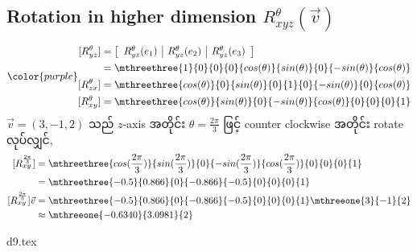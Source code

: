 \subsection{Rotation in higher dimension $R_{xyz}^\theta(\vec{v})$}
\begin{equation}
    {\color{purple}\begin{split}
        [R_{yz}^\theta]&=\left[\begin{array}{c|c|c}
            R_{yz}^\theta(e_1) & R_{yz}^\theta(e_2) & R_{yz}^\theta(e_3)
        \end{array}\right] \\
        &=\mthreethree{1}{0}{0}{0}{cos(\theta)}{sin(\theta)}{0}{-sin(\theta)}{cos(\theta)} \\
        [R_{zx}^\theta]&=\mthreethree{cos(\theta)}{0}{sin(\theta)}{0}{1}{0}{-sin(\theta)}{0}{cos(\theta)} \\
        [R_{xy}^\theta]&=\mthreethree{cos(\theta)}{sin(\theta)}{0}{-sin(\theta)}{cos(\theta)}{0}{0}{0}{1}
    \end{split}}
\end{equation}
$\vec{v}=(3,-1,2)$ သည် $z$-axis အတိုင်း $\theta=\frac{2\pi}{3}$ ဖြင့် counter clockwise အတိုင်း rotate လုပ်လျှင်,
\[
    \begin{split}
        [R_{xy}^{\frac{2\pi}{3}}]&=\mthreethree{cos(\frac{2\pi}{3})}{sin(\frac{2\pi}{3})}{0}{-sin(\frac{2\pi}{3})}{cos(\frac{2\pi}{3})}{0}{0}{0}{1} \\
        &=\mthreethree{-0.5}{0.866}{0}{-0.866}{-0.5}{0}{0}{0}{1} \\
        [R_{xy}^{\frac{2\pi}{3}}]\vec{v}&=\mthreethree{-0.5}{0.866}{0}{-0.866}{-0.5}{0}{0}{0}{1}\mthreeone{3}{-1}{2} \\
        &\approx\mthreeone{-0.6340}{3.0981}{2}
    \end{split}
\]
\begin{center}
    {d9.tex}
\end{center}
